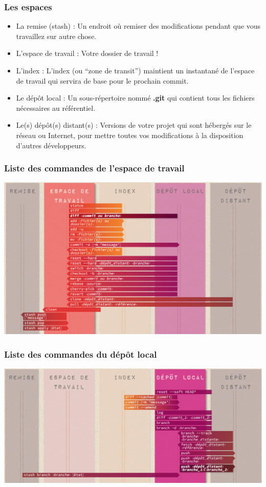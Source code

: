 \begin{frame}
    \frametitle{Les espaces}
    \begin{itemize}
        \item La remise (stash) : Un endroit où remiser des modifications pendant que vous travaillez sur autre chose.
        \item L'espace de travail : Votre dossier de travail !
        \item L'index : L'index (ou \enquote{zone de transit}) maintient un instantané de l'espace de travail qui servira de base pour le prochain commit.
        \item Le dépôt local : Un sous-répertoire nommé \textbf{.git} qui contient tous les fichiers nécessaires au référentiel.
        \item Le(s) dépôt(s) distant(s) : Versions de votre projet qui sont hébergés sur le réseau ou Internet, pour mettre toutes vos modifications à la disposition d'autres développeurs.
    \end{itemize}
\end{frame}

\begin{frame}
    \frametitle{Liste des commandes de l'espace de travail}
    \centering
    \includegraphics[height=0.5\linewidth]{figures/environnement/git-workspace}
\end{frame}

\begin{frame}
    \frametitle{Liste des commandes du dépôt local}
    \centering
    \includegraphics[width=\linewidth]{figures/environnement/git-local-repo}
\end{frame}

